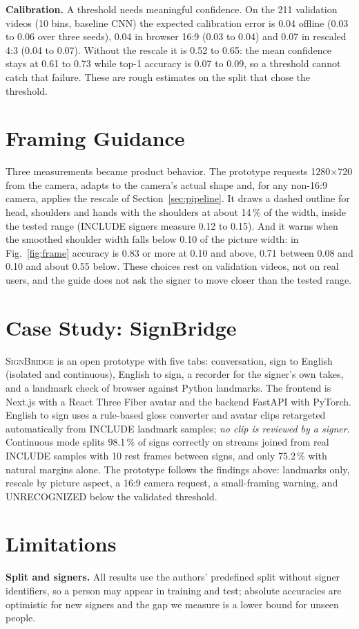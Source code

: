 \documentclass[conference]{IEEEtran}
\newcommand{\signbridge}{\textsc{SignBridge}}
\begin{document}
\textbf{Calibration.} A threshold needs meaningful confidence. On the 211 validation videos (10 bins, baseline CNN) the expected calibration error is 0.04 offline (0.03 to 0.06 over three seeds), 0.04 in browser 16:9 (0.03 to 0.04) and 0.07 in rescaled 4:3 (0.04 to 0.07). Without the rescale it is 0.52 to 0.65: the mean confidence stays at 0.61 to 0.73 while top-1 accuracy is 0.07 to 0.09, so a threshold cannot catch that failure. These are rough estimates on the split that chose the threshold.

\section{Framing Guidance}\label{sec:guidance}
Three measurements became product behavior. The prototype requests 1280$\times$720 from the camera, adapts to the camera's actual shape and, for any non-16:9 camera, applies the rescale of Section~\ref{sec:pipeline}. It draws a dashed outline for head, shoulders and hands with the shoulders at about 14\,\% of the width, inside the tested range (INCLUDE signers measure 0.12 to 0.15). And it warns when the smoothed shoulder width falls below 0.10 of the picture width: in Fig.~\ref{fig:frame} accuracy is 0.83 or more at 0.10 and above, 0.71 between 0.08 and 0.10 and about 0.55 below. These choices rest on validation videos, not on real users, and the guide does not ask the signer to move closer than the tested range.

\section{Case Study: SignBridge}\label{sec:case}
\signbridge{} is an open prototype with five tabs: conversation, sign to English (isolated and continuous), English to sign, a recorder for the signer's own takes, and a landmark check of browser against Python landmarks. The frontend is Next.js with a React Three Fiber avatar and the backend FastAPI with PyTorch. English to sign uses a rule-based gloss converter and avatar clips retargeted automatically from INCLUDE landmark samples; \emph{no clip is reviewed by a signer}. Continuous mode splits 98.1\,\% of signs correctly on streams joined from real INCLUDE samples with 10 rest frames between signs, and only 75.2\,\% with natural margins alone. The prototype follows the findings above: landmarks only, rescale by picture aspect, a 16:9 camera request, a small-framing warning, and UNRECOGNIZED below the validated threshold.

\section{Limitations}\label{sec:limits}
\textbf{Split and signers.} All results use the authors' predefined split without signer identifiers, so a person may appear in training and test; absolute accuracies are optimistic for new signers and the gap we measure is a lower bound for unseen people.
\end{document}
